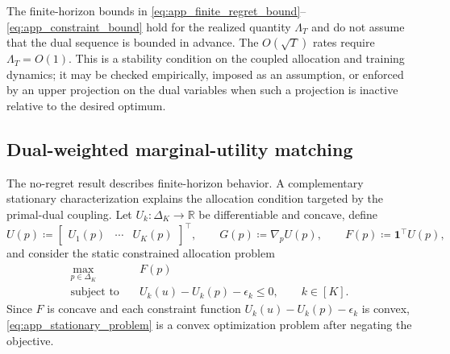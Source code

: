 \begin{remark}
\label{rem:app_dual_stability}
The finite-horizon bounds in \eqref{eq:app_finite_regret_bound}--\eqref{eq:app_constraint_bound} hold for the realized quantity $\Lambda_T$ and do not assume that the dual sequence is bounded in advance. The $O(\sqrt{T})$ rates require $\Lambda_T=O(1)$. This is a stability condition on the coupled allocation and training dynamics; it may be checked empirically, imposed as an assumption, or enforced by an upper projection on the dual variables when such a projection is inactive relative to the desired optimum.
\end{remark}

\subsection{Dual-weighted marginal-utility matching}
\label{app:theory_matching}

The no-regret result describes finite-horizon behavior. A complementary stationary characterization explains the allocation condition targeted by the primal-dual coupling. Let $U_k:\Delta_K\to\mathbb{R}$ be differentiable and concave, define
\begin{equation}
    U(p)
    \coloneqq
    \begin{bmatrix}
        U_1(p)&\cdots&U_K(p)
    \end{bmatrix}^{\!\top},
    \qquad
    G(p)\coloneqq\nabla_p U(p),
    \qquad
    F(p)\coloneqq\mathbf{1}^\top U(p),
\end{equation}
and consider the static constrained allocation problem
\begin{equation}
\begin{aligned}
    \max_{p\in\Delta_K}\quad
    &F(p)\\
    \text{subject to}\quad
    &U_k(u)-U_k(p)-\epsilon_k\le0,
    \qquad k\in[K].
\end{aligned}
\label{eq:app_stationary_problem}
\end{equation}
Since $F$ is concave and each constraint function $U_k(u)-U_k(p)-\epsilon_k$ is convex, \eqref{eq:app_stationary_problem} is a convex optimization problem after negating the objective.

